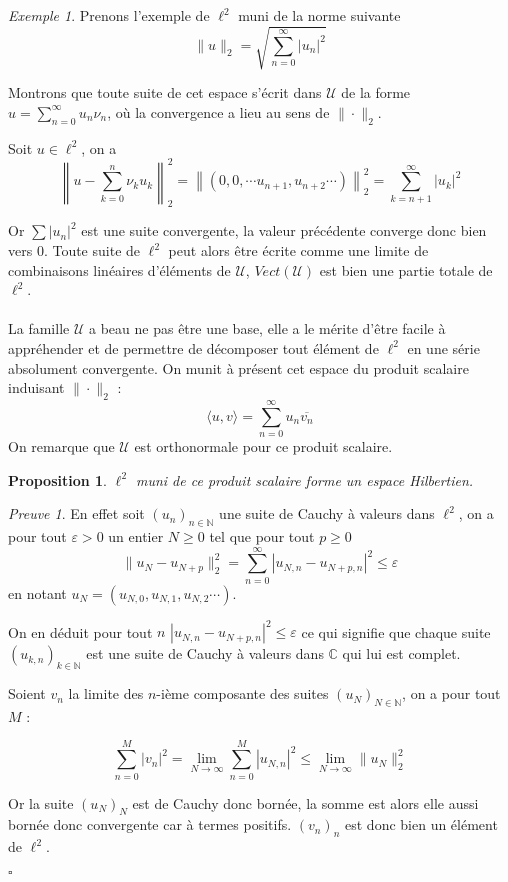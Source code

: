 \documentclass[]{article}
\newtheorem{myproposition}{Proposition}
\theoremstyle{remark}
\newtheorem{myproof}{Preuve}
\newtheorem{myexmpl}{Exemple}
\theoremstyle{definition}
\newcommand{\cqfd}{
	\hfill$\square$
}
\newcommand{\DS}{\displaystyle}
\begin{document}
	\begin{myexmpl}
		Prenons l'exemple de $\ell^2$ muni de la norme suivante $$\|u\|_2 = \sqrt{\sum_{n = 0}^\infty |u_n|^2}$$
		
		Montrons que toute suite de cet espace s'écrit dans $\mathcal{U}$ de la forme $\DS u = \sum_{n = 0}^\infty u_n \nu_n$, où la convergence a lieu au sens de $\|\cdot\|_2$.
		
		Soit $u \in \ell^2$, on a $$\left\|u - \sum_{k = 0}^{n} \nu_k u_k\right\|_2^2 = \left\|(0, 0, \cdots u_{n+1}, u_{n+2} \cdots)\right\|_2^2 = \sum_{k = n+1}^\infty |u_k|^2$$
		
		Or $\sum |u_n|^2$ est une suite convergente, la valeur précédente converge donc bien vers 0. Toute suite de $\ell^2$ peut alors être écrite comme une limite de combinaisons linéaires d'éléments de $\mathcal{U}$, $Vect(\mathcal{U})$ est bien une partie totale de $\ell^2$.
	\end{myexmpl}
	
	\paragraph*{}
	La famille $\mathcal{U}$ a beau ne pas être une base, elle a le mérite d'être facile à appréhender et de permettre de décomposer tout élément de $\ell^2$ en une série absolument convergente. On munit à présent cet espace du produit scalaire induisant $\|\cdot\|_2$ : $$\langle u, v \rangle = \sum_{n = 0}^\infty u_n \overline{v_n}$$
	On remarque que $\mathcal{U}$ est orthonormale pour ce produit scalaire.
	
	\begin{myproposition}
		$\ell^2$ muni de ce produit scalaire forme un espace Hilbertien.
	\end{myproposition}

	\begin{myproof}
		En effet soit $(u_n)_{n \in \mathbb{N}}$ une suite de Cauchy à valeurs dans $\ell^2$, on a pour tout $\varepsilon > 0$ un entier $N \geqslant 0$ tel que pour tout $p \geqslant 0$ $$\|u_N - u_{N+p}\|^2_2 = \sum_{n=0}^{\infty} |u_{N, n} - u_{N+p, n}|^2 \leqslant \varepsilon$$
		en notant $u_N=(u_{N, 0}, u_{N, 1}, u_{N, 2} \cdots)$.
		
		On en déduit pour tout $n$ $|u_{N, n} - u_{N+p, n}|^2 \leqslant \varepsilon$ ce qui signifie que chaque suite $(u_{k, n})_{k \in \mathbb{N}}$ est une suite de Cauchy à valeurs dans $\mathbb{C}$ qui lui est complet.
		
		Soient $v_n$ la limite des $n$-ième composante des suites $(u_N)_{N \in \mathbb{N}}$, on a pour tout $M$ :
		
		$$\sum_{n=0}^{M} |v_n|^2 = \lim\limits_{N \to \infty} \sum_{n=0}^{M} |u_{N, n}|^2 \leqslant \lim\limits_{N\to \infty} \|u_N\|_2^2$$
		
		Or la suite $(u_N)_N$ est de Cauchy donc bornée, la somme est alors elle aussi bornée donc convergente car à termes positifs. $(v_n)_n$ est donc bien un élément de $\ell^2$.
		
		\cqfd
	\end{myproof}
	
\end{document}
